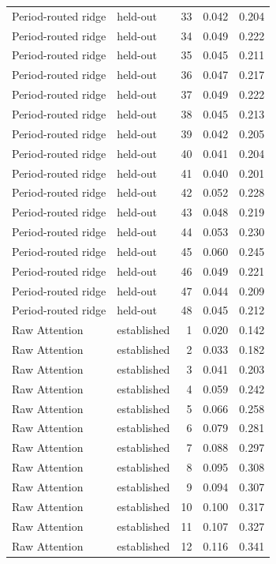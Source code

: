 \begin{tabular}{llrrr}
Period-routed ridge & held-out & 33 & 0.042 & 0.204 \\
Period-routed ridge & held-out & 34 & 0.049 & 0.222 \\
Period-routed ridge & held-out & 35 & 0.045 & 0.211 \\
Period-routed ridge & held-out & 36 & 0.047 & 0.217 \\
Period-routed ridge & held-out & 37 & 0.049 & 0.222 \\
Period-routed ridge & held-out & 38 & 0.045 & 0.213 \\
Period-routed ridge & held-out & 39 & 0.042 & 0.205 \\
Period-routed ridge & held-out & 40 & 0.041 & 0.204 \\
Period-routed ridge & held-out & 41 & 0.040 & 0.201 \\
Period-routed ridge & held-out & 42 & 0.052 & 0.228 \\
Period-routed ridge & held-out & 43 & 0.048 & 0.219 \\
Period-routed ridge & held-out & 44 & 0.053 & 0.230 \\
Period-routed ridge & held-out & 45 & 0.060 & 0.245 \\
Period-routed ridge & held-out & 46 & 0.049 & 0.221 \\
Period-routed ridge & held-out & 47 & 0.044 & 0.209 \\
Period-routed ridge & held-out & 48 & 0.045 & 0.212 \\
Raw Attention & established & 1 & 0.020 & 0.142 \\
Raw Attention & established & 2 & 0.033 & 0.182 \\
Raw Attention & established & 3 & 0.041 & 0.203 \\
Raw Attention & established & 4 & 0.059 & 0.242 \\
Raw Attention & established & 5 & 0.066 & 0.258 \\
Raw Attention & established & 6 & 0.079 & 0.281 \\
Raw Attention & established & 7 & 0.088 & 0.297 \\
Raw Attention & established & 8 & 0.095 & 0.308 \\
Raw Attention & established & 9 & 0.094 & 0.307 \\
Raw Attention & established & 10 & 0.100 & 0.317 \\
Raw Attention & established & 11 & 0.107 & 0.327 \\
Raw Attention & established & 12 & 0.116 & 0.341 \\

\end{tabular}

